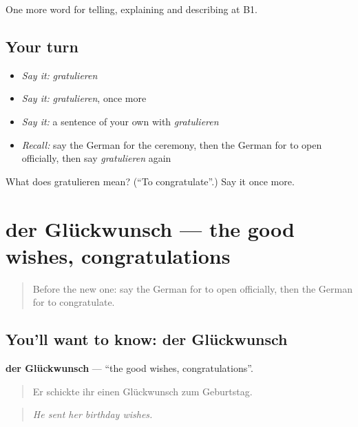 \begin{grammarlens}[title={What you've built}]
One more word for telling, explaining and describing at B1.
\end{grammarlens}

\subsection*{Your turn}
\begin{itemize}
\raggedright
  \item \emph{Say it:} \emph{gratulieren}
  \item \emph{Say it:} \emph{gratulieren}, once more
  \item \emph{Say it:} a sentence of your own with \emph{gratulieren}
  \item \emph{Recall:} say the German for the ceremony, then the German for to open officially, then say \emph{gratulieren} again
\end{itemize}

\begin{tcolorbox}[breakable,colback=teal!4,colframe=teal!35!black,title={Before you move on}]
What does gratulieren mean? (\textquotedblleft{}To congratulate\textquotedblright{}.) Say it once more.
\end{tcolorbox}
\section[der Glückwunsch]{der Glückwunsch — the good wishes, congratulations}

\label{lesson:GE-C306-glueckwunsch}



\begin{quote}
Before the new one: say the German for to open officially, then the German for to congratulate.
\end{quote}

\subsection*{You'll want to know: der Glückwunsch}
\textbf{der Glückwunsch} — \textquotedblleft{}the good wishes, congratulations\textquotedblright{}.

\begin{quote}
Er schickte ihr einen Glückwunsch zum Geburtstag.
\end{quote}

\begin{quote}
\emph{He sent her birthday wishes.}
\end{quote}

